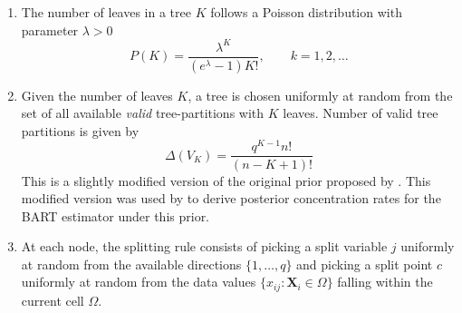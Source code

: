 \documentclass[12pt]{article}
\newcommand{\bm}[1]{\boldsymbol{#1}}
\newcommand{\1}{\mathbb{I}}
\def\X{\bm{X}}
\def\X{\mbox{\boldmath$X$}}
\def\X{\bm{X}}
\theoremstyle{plain}
\theoremstyle{definition}
\theoremstyle{remark}
\begin{document}
\begin{enumerate}
\item The number of leaves in a tree $K$ follows a Poisson distribution with parameter $\lambda > 0$
\begin{equation}
P(K)=\frac{\lambda^K}{(e^\lambda-1)K!}, \qquad k=1,2,\dots
\end{equation}
\item Given the number of leaves $K$, a tree is chosen uniformly at random from the set of all available {\it valid} tree-partitions with $K$ leaves. Number of valid tree partitions is given by
\begin{equation}
\Delta(V_K)=\frac{q^{K-1}n!}{(n-K+1)!}
\end{equation}
This is a slightly modified version of the original prior proposed by \cite{denison1998bayesian}. This modified version was used by \cite{rockova2020posterior} to derive posterior concentration rates for the BART estimator under this prior.
\item At each node, the splitting rule consists of picking a split variable $j$ uniformly at random from the available directions $\{1,\dots, q\}$ and picking a split point $c$ uniformly at random from the data values $\{x_{ij} : \X_i \in \Omega\}$ falling within the current cell $\Omega$.
\end{enumerate}
\end{document}
